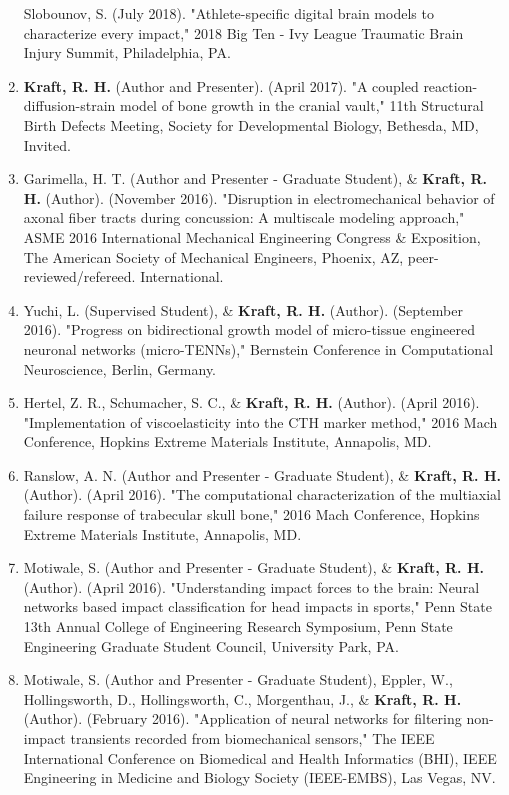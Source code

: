 \documentclass[a4paper,10pt]{article}
\begin{document}
\begin{enumerate}
 Slobounov, S. (July 2018). "Athlete-specific digital brain models to characterize every impact," 2018 Big Ten - Ivy League Traumatic Brain Injury Summit, Philadelphia, PA.
  \item \textbf{\textbf{Kraft,} R. H.} (Author and Presenter). (April 2017). "A coupled reaction-diffusion-strain model of bone growth in the cranial vault," 11th Structural Birth Defects Meeting, Society for Developmental Biology, Bethesda, MD, Invited.
  \item Garimella, H. T. (Author and Presenter - Graduate Student), \&
 \textbf{\textbf{Kraft,} R. H.} (Author). (November 2016). "Disruption in electromechanical behavior of axonal fiber tracts during concussion: A multiscale modeling approach," ASME 2016 International Mechanical Engineering Congress \&
 Exposition, The American Society of Mechanical Engineers, Phoenix, AZ, peer-reviewed/refereed. International.
  \item Yuchi, L. (Supervised Student), \&
 \textbf{\textbf{Kraft,} R. H.} (Author). (September 2016). "Progress on bidirectional growth model of micro-tissue engineered neuronal networks (micro-TENNs)," Bernstein Conference in Computational Neuroscience, Berlin, Germany.
  \item Hertel, Z. R., Schumacher, S. C., \&
 \textbf{\textbf{Kraft,} R. H.} (Author). (April 2016). "Implementation of viscoelasticity into the CTH marker method," 2016 Mach Conference, Hopkins Extreme Materials Institute, Annapolis, MD.
  \item Ranslow, A. N. (Author and Presenter - Graduate Student), \&
 \textbf{\textbf{Kraft,} R. H.} (Author). (April 2016). "The computational characterization of the multiaxial failure response of trabecular skull bone," 2016 Mach Conference, Hopkins Extreme Materials Institute, Annapolis, MD.
  \item Motiwale, S. (Author and Presenter - Graduate Student), \&
 \textbf{\textbf{Kraft,} R. H.} (Author). (April 2016). "Understanding impact forces to the brain: Neural networks based impact classification for head impacts in sports," Penn State 13th Annual College of Engineering Research Symposium, Penn State Engineering Graduate Student Council, University Park, PA.
  \item Motiwale, S. (Author and Presenter - Graduate Student), Eppler, W., Hollingsworth, D., Hollingsworth, C., Morgenthau, J., \&
 \textbf{\textbf{Kraft,} R. H.} (Author). (February 2016). "Application of neural networks for filtering non-impact transients recorded from biomechanical sensors," The IEEE International Conference on Biomedical and Health Informatics (BHI), IEEE Engineering in Medicine and Biology Society (IEEE-EMBS), Las Vegas, NV.

\end{enumerate}
\end{document}
